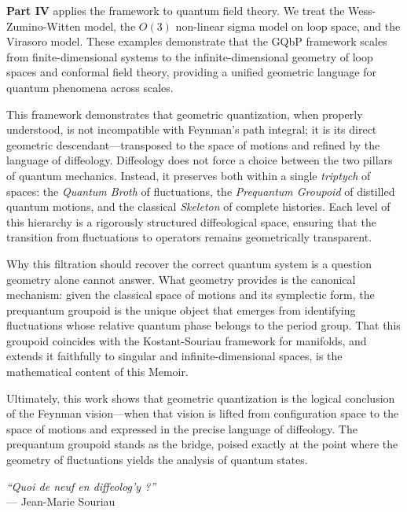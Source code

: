 \textbf{Part IV} applies the framework to quantum field theory.
We treat the Wess-Zumino-Witten model,
the $O(3)$ non-linear sigma model on loop space,
and the Virasoro model.
These examples demonstrate that the GQbP framework scales from finite-dimensional systems to the infinite-dimensional geometry of loop spaces and conformal field theory,
providing a unified geometric language for quantum phenomena across scales.

This framework demonstrates that geometric quantization,
when properly understood,
is not incompatible with Feynman's path integral;
it is its direct geometric descendant---transposed to the space of motions and refined by the language of diffeology.
Diffeology does not force a choice between the two pillars of quantum mechanics.
Instead,
it preserves both within a single \emph{triptych} of spaces:
the \emph{Quantum Broth} of fluctuations,
the \emph{Prequantum Groupoid} of distilled quantum motions,
and the classical \emph{Skeleton} of complete histories.
Each level of this hierarchy is a rigorously structured diffeological space,
ensuring that the transition from fluctuations to operators remains geometrically transparent.

Why this filtration should recover the correct quantum system is a question geometry alone cannot answer.
What geometry provides is the canonical mechanism:
given the classical space of motions and its symplectic form,
the prequantum groupoid is the unique object that emerges from identifying fluctuations whose relative quantum phase belongs to the period group.
That this groupoid coincides with the Kostant-Souriau framework for manifolds,
and extends it faithfully to singular and infinite-dimensional spaces,
is the mathematical content of this Memoir.

Ultimately,
this work shows that geometric quantization is the logical conclusion of the Feynman vision---when that vision is lifted from configuration space to the space of motions and expressed in the precise language of diffeology.
The prequantum groupoid stands as the bridge,
poised exactly at the point where the geometry of fluctuations yields the analysis of quantum states.

\vspace{2em}
\begin{flushright}
  \emph{``Quoi de neuf en diffeolog'y ?''} \\
  --- Jean-Marie Souriau
\end{flushright}
